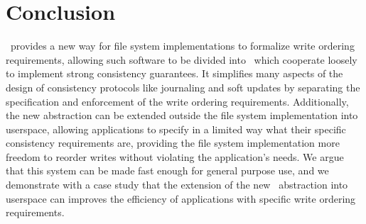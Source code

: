 \section{Conclusion}
\label{sec:conclusion}

\Kudos\ provides a new way for file system implementations to formalize write
ordering requirements, allowing such software to be divided into \modules\ which
cooperate loosely to implement strong consistency guarantees. It simplifies many
aspects of the design of consistency protocols like journaling and soft updates
by separating the specification and enforcement of the write ordering
requirements. Additionally, the new abstraction can be extended outside the file
system implementation into userspace, allowing applications to specify in a
limited way what their specific consistency requirements are, providing the file
system implementation more freedom to reorder writes without violating the
application's needs. We argue that this system can be made fast enough for
general purpose use, and we demonstrate with a case study that the extension of
the new \Kudos\ abstraction into userspace can improves the efficiency of
applications with specific write ordering requirements.
